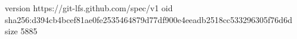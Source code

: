 version https://git-lfs.github.com/spec/v1
oid sha256:d394cb4bcef81ae0fe2535464879d77df900e4eeadb2518cc533296305f76d6d
size 5885
